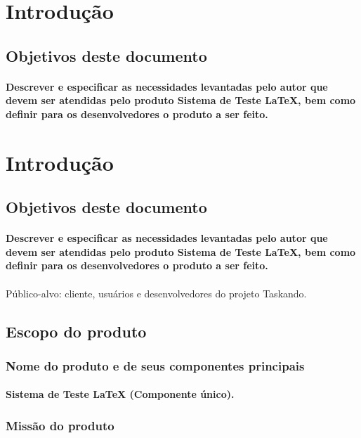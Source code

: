 \documentclass{article}
\begin{document}
\newpage

\section{Introdução}
	\subsection{Objetivos deste documento}
		\paragraph{Descrever e especificar as necessidades levantadas pelo autor que devem ser atendidas pelo produto Sistema de Teste LaTeX, bem como definir para os desenvolvedores o produto a ser feito.}

\newpage

\section{Introdução}
	\subsection{Objetivos deste documento}
		\paragraph{Descrever e especificar as necessidades levantadas pelo autor que devem ser atendidas pelo produto Sistema de Teste LaTeX, bem como definir para os desenvolvedores o produto a ser feito.}
\paragraph{}Público-alvo: cliente, usuários e desenvolvedores do projeto Taskando.
	\subsection{Escopo do produto}
		\subsubsection{Nome do produto e de seus componentes principais}
			\paragraph{Sistema de Teste LaTeX (Componente único). }
		\subsubsection{Missão do produto}
\end{document}
